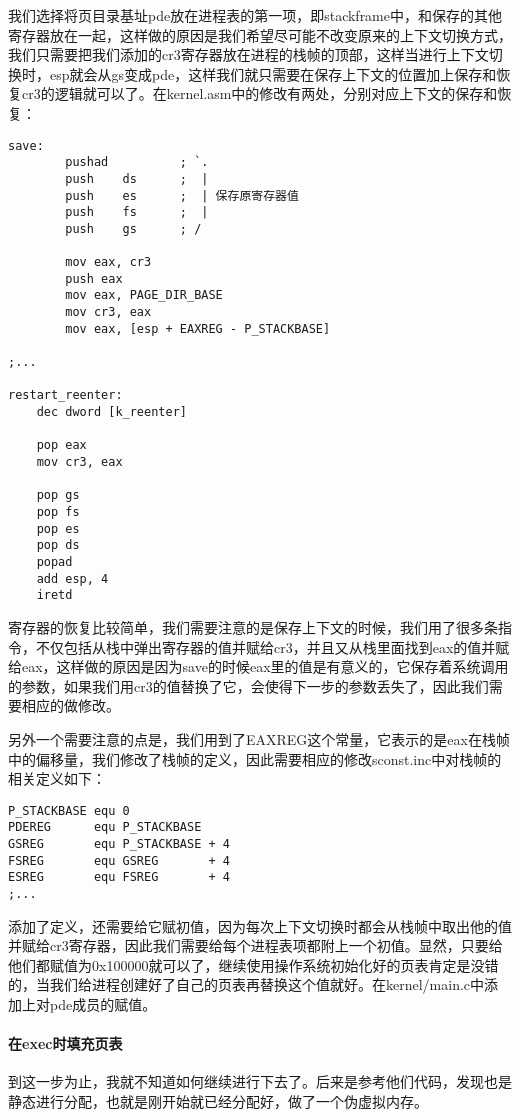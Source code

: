 \documentclass{whureport}
\begin{document}
我们选择将页目录基址pde放在进程表的第一项，即stackframe中，和保存的其他寄存器放在一起，这样做的原因是我们希望尽可能不改变原来的上下文切换方式，我们只需要把我们添加的cr3寄存器放在进程的栈帧的顶部，这样当进行上下文切换时，esp就会从gs变成pde，这样我们就只需要在保存上下文的位置加上保存和恢复cr3的逻辑就可以了。在kernel.asm中的修改有两处，分别对应上下文的保存和恢复：

\begin{lstlisting}
save:
        pushad          ; `.
        push    ds      ;  |
        push    es      ;  | 保存原寄存器值
        push    fs      ;  |
        push    gs      ; /

		mov eax, cr3
		push eax
		mov eax, PAGE_DIR_BASE
		mov cr3, eax
		mov eax, [esp + EAXREG - P_STACKBASE]

;...

restart_reenter:
	dec	dword [k_reenter]

	pop eax
	mov cr3, eax

	pop	gs
	pop	fs
	pop	es
	pop	ds
	popad
	add	esp, 4
	iretd

\end{lstlisting}


寄存器的恢复比较简单，我们需要注意的是保存上下文的时候，我们用了很多条指令，不仅包括从栈中弹出寄存器的值并赋给cr3，并且又从栈里面找到eax的值并赋给eax，这样做的原因是因为save的时候eax里的值是有意义的，它保存着系统调用的参数，如果我们用cr3的值替换了它，会使得下一步的参数丢失了，因此我们需要相应的做修改。

另外一个需要注意的点是，我们用到了EAXREG这个常量，它表示的是eax在栈帧中的偏移量，我们修改了栈帧的定义，因此需要相应的修改sconst.inc中对栈帧的相关定义如下：

\begin{lstlisting}
P_STACKBASE	equ	0
PDEREG      equ P_STACKBASE
GSREG		equ	P_STACKBASE + 4
FSREG		equ	GSREG		+ 4
ESREG		equ	FSREG		+ 4
;...
\end{lstlisting}


添加了定义，还需要给它赋初值，因为每次上下文切换时都会从栈帧中取出他的值并赋给cr3寄存器，因此我们需要给每个进程表项都附上一个初值。显然，只要给他们都赋值为0x100000就可以了，继续使用操作系统初始化好的页表肯定是没错的，当我们给进程创建好了自己的页表再替换这个值就好。在kernel/main.c中添加上对pde成员的赋值。



\paragraph{在exec时填充页表} 到这一步为止，我就不知道如何继续进行下去了。后来是参考他们代码，发现也是静态进行分配，也就是刚开始就已经分配好，做了一个伪虚拟内存。
\end{document}
